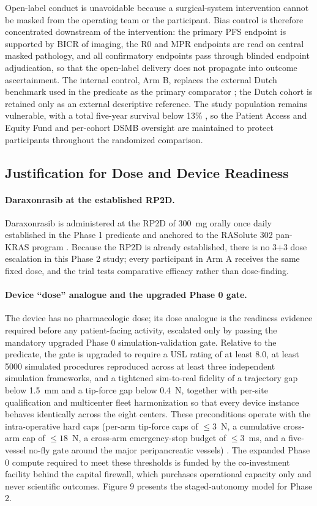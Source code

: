 Open-label conduct is unavoidable because a surgical-system intervention cannot be
masked from the operating team or the participant. Bias control is therefore
concentrated downstream of the intervention: the primary PFS endpoint is supported
by BICR of imaging, the R0 and MPR endpoints are read on central masked pathology,
and all confirmatory endpoints pass through blinded endpoint adjudication, so that
the open-label delivery does not propagate into outcome ascertainment. The internal
control, Arm B, replaces the external Dutch benchmark used in the predicate as the
primary comparator \cite{DutchCohort2025}; the Dutch cohort is retained only as an
external descriptive reference. The study population remains vulnerable, with a
total five-year survival below 13\% \cite{Siegel2025}, so the Patient Access and
Equity Fund and per-cohort DSMB oversight are maintained to protect participants
throughout the randomized comparison.

\subsection{Justification for Dose and Device Readiness}

\paragraph{Daraxonrasib at the established RP2D.}
Daraxonrasib is administered at the RP2D of 300~mg orally once daily established in
the Phase 1 predicate and anchored to the RASolute 302 pan-KRAS program
\cite{kawchak2026phase1,rasolute302}. Because the RP2D is already established, there
is no 3+3 dose escalation in this Phase 2 study; every participant in Arm A receives
the same fixed dose, and the trial tests comparative efficacy rather than
dose-finding.

\paragraph{Device ``dose'' analogue and the upgraded Phase 0 gate.}
The device has no pharmacologic dose; its dose analogue is the readiness evidence
required before any patient-facing activity, escalated only by passing the mandatory
upgraded Phase 0 simulation-validation gate. Relative to the predicate, the gate is
upgraded to require a USL rating of at least 8.0, at least 5000 simulated procedures
reproduced across at least three independent simulation frameworks, and a tightened
sim-to-real fidelity of a trajectory gap below 1.5~mm and a tip-force gap below
0.4~N, together with per-site qualification and multicenter fleet harmonization so
that every device instance behaves identically across the eight centers. These
preconditions operate with the intra-operative hard caps (per-arm tip-force caps of
$\leq 3$~N, a cumulative cross-arm cap of $\leq 18$~N, a cross-arm emergency-stop
budget of $\leq 3$~ms, and a five-vessel no-fly gate around the major peripancreatic
vessels) \cite{ecfr2026part812,kawchak2026adapt312}. The expanded Phase 0 compute
required to meet these thresholds is funded by the co-investment facility behind the
capital firewall, which purchases operational capacity only and never scientific
outcomes. Figure 9 presents the staged-autonomy model for Phase 2.

